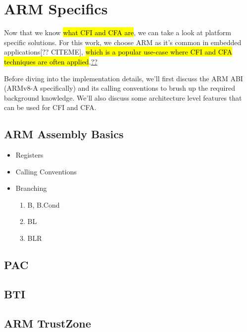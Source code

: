 \documentclass[a4paper, nobind]{templates/ociamthesis}
\providecommand{\tightlist}{%
  \setlength{\itemsep}{0pt}\setlength{\parskip}{0pt}}
\begin{document}
\section{ARM Specifics}\label{arm-specifics}

Now that we know \hl{what CFI and CFA are}, we can take a look at platform specific solutions.
For this work, we choose ARM as it's common in embedded applications{[}?? CITEME{]},
\hl{which is a popular use-case where CFI and CFA techniques are often applied}.\href{}{??}

Before diving into the implementation details, we'll first discuss the ARM ABI
(ARMv8-A specifically) and its calling conventions to brush up the required background knowledge.
We'll also discuss some architecture level features that can be used for CFI and CFA.

\subsection{ARM Assembly Basics}\label{arm-assembly-basics}

\begin{itemize}
\tightlist
\item
  Registers
\item
  Calling Conventions
\item
  Branching

  \begin{enumerate}
  \def\labelenumi{\arabic{enumi}.}
  \tightlist
  \item
    B, B.Cond
  \item
    BL
  \item
    BLR
  \end{enumerate}
\end{itemize}

\subsection{PAC}\label{pac}

\subsection{BTI}\label{bti}

\subsection{ARM TrustZone}\label{arm-trustzone}
\end{document}
